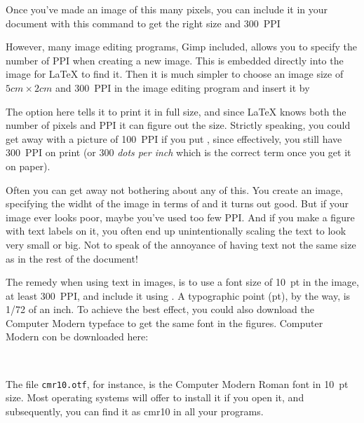 {Once you've made an image of this many pixels, you can include it in your document with this command to get the right size and 300~PPI

\noindent However, many image editing programs, Gimp included, allows you to specify the number of PPI when creating a new image. This is embedded directly into the image for \LaTeX{} to find it. Then it is much simpler to choose an image size of $5\si{cm}\times 2\si{cm}$ and 300~PPI in the image editing program and insert it by

\noindent The  option here tells it to print it in full size, and since \LaTeX{} knows both the number of pixels and PPI it can figure out the size. Strictly speaking, you could get away with a picture of 100~PPI if you put , since effectively, you still have 300~PPI on print (or 300 \emph{dots per inch} which is the correct term once you get it on paper).


Often you can get away not bothering about any of this. You create an image, specifying the widht of the image in terms of \latexin{\textwidth} and it turns out good. But if your image ever looks poor, maybe you've used too few PPI. And if you make a figure with text labels on it, you often end up unintentionally scaling the text to look very small or big. Not to speak of the annoyance of having text not the same size as in the rest of the document!

The remedy when using text in images, is to use a font size of 10~pt in the image, at least 300~PPI, and include it using . A typographic point (pt), by the way, is 1/72 of an inch. To achieve the best effect, you could also download the Computer Modern typeface to get the same font in the figures. Computer Modern con be downloaded here:

~\\

The file \verb|cmr10.otf|, for instance, is the Computer Modern Roman font in 10~pt size. Most operating systems will offer to install it if you open it, and subsequently, you can find it as cmr10 in all your programs.

}
